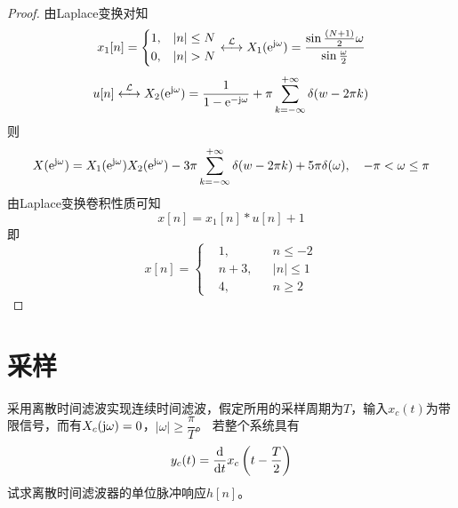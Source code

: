 \begin{proof}
    
    由\textup{Laplace}变换对知
    $$x_1[n] = \left\{
        \begin{aligned}
            & 1, & |n| \leq N \\
            & 0, & |n| > N 
        \end{aligned}
        \right. \stackrel{\mathcal{L}}{\longleftrightarrow} X_1(\mathrm{e}^{\mathrm{j} \omega})  = \dfrac{\sin \frac{(N + 1)}{2}\omega}{\sin \frac{\omega}{2}}$$ 
    $$u[n] \stackrel{\mathcal{L}}{\longleftrightarrow} X_2(\mathrm{e}^{\mathrm{j} \omega}) = \dfrac{1}{1 - \mathrm{e}^{-\mathrm{j} \omega}} + \pi\sum\limits_{k = -\infty}^{+\infty}{\delta(w - 2\pi k)}$$
    则
    $$X(\mathrm{e}^{\mathrm{j} \omega}) = X_1(\mathrm{e}^{\mathrm{j} \omega}) X_2(\mathrm{e}^{\mathrm{j} \omega}) - 3\pi\sum\limits_{k = -\infty}^{+\infty}{\delta(w - 2\pi k)} + 5\pi\delta(\omega), \quad -\pi < \omega \leq \pi$$
    由\textup{Laplace}变换卷积性质可知
    $$x[n] = x_1[n] \ast u[n] + 1$$
    即
    $$x[n] = \left\{
        \begin{aligned}
            & 1, && n \leq -2 \\
            & n + 3, && |n| \leq 1 \\
            & 4, && n \geq 2 
        \end{aligned}
        \right. 
    $$

\end{proof}

\section{采样}

\begin{proposition}

    采用离散时间滤波实现连续时间滤波，假定所用的采样周期为$T$，输入$x_c(t)$为带限信号，而有$X_c(\mathrm{j} \omega) = 0$，$|\omega| \geq \dfrac{\pi}{T}$。
    若整个系统具有
    $$y_c(t) = \dfrac{\mathrm{d}}{\mathrm{d} t}x_c\left(t - \dfrac{T}{2}\right)$$
    试求离散时间滤波器的单位脉冲响应$h[n]$。

\end{proposition}

